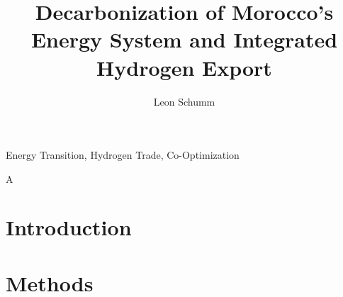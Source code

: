 \documentclass[5p]{elsarticle}
\begin{document}
\begin{frontmatter}

	\title{Decarbonization of Morocco’s Energy System and Integrated Hydrogen Export}
    
	\author[tub, oth]{Leon Schumm}


	\address[tub]{Department of Digital Transformation in Energy Systems, Institute of Energy Technology, Technische Universität Berlin, Fakultät III, Einsteinufer 25 (TA 8), 10587 Berlin, Germany}
	\address[oth]{Research Center on Energy Transmission and Storage (FENES), Faculty of Electrical and Information Technology, University of Applied Sciences (OTH) Regensburg, Seybothstrasse 2, 93053 Regensburg, Germany}

	\begin{abstract}
		
	\end{abstract}

	\begin{keyword}
		Energy Transition, Hydrogen Trade, Co-Optimization
	\end{keyword}


	\begin{highlights}
		\item A
	\end{highlights}

\end{frontmatter}



\section{Introduction}
\label{sec:intro}



\section{Methods}
\label{sec:methods}


\end{document}
